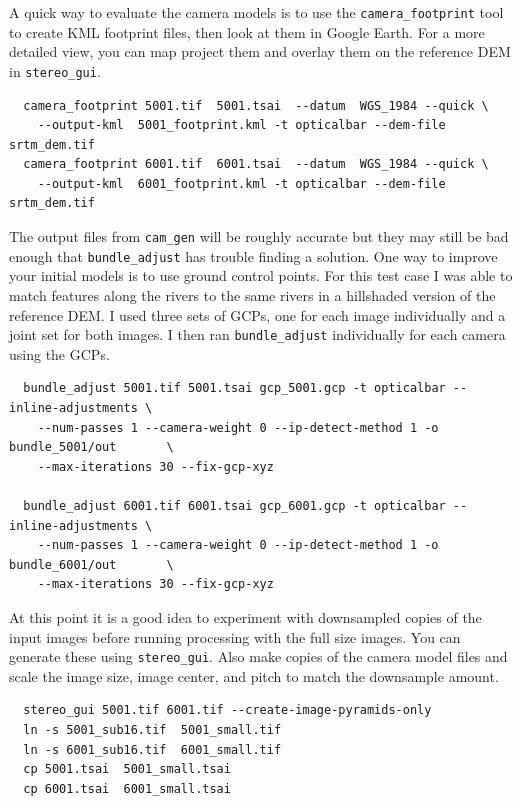 A quick way to evaluate the camera models is to use the \texttt{camera\_footprint} tool to
create KML footprint files, then look at them in Google Earth.  For a more detailed view,
you can map project them and overlay them on the reference DEM in \texttt{stereo\_gui}.

\begin{verbatim}
  camera_footprint 5001.tif  5001.tsai  --datum  WGS_1984 --quick \
    --output-kml  5001_footprint.kml -t opticalbar --dem-file srtm_dem.tif
  camera_footprint 6001.tif  6001.tsai  --datum  WGS_1984 --quick \
    --output-kml  6001_footprint.kml -t opticalbar --dem-file srtm_dem.tif
\end{verbatim}

The output files from \texttt{cam\_gen} will be roughly accurate but they may still be bad
enough that \texttt{bundle\_adjust} has trouble finding a solution.  One way to improve your
initial models is to use ground control points.  For this test case I was able to match
features along the rivers to the same rivers in a hillshaded version of the reference DEM.
I used three sets of GCPs, one for each image individually and a joint set for both images.
I then ran \texttt{bundle\_adjust} individually for each camera using the GCPs.

\begin{verbatim}
  bundle_adjust 5001.tif 5001.tsai gcp_5001.gcp -t opticalbar --inline-adjustments \
    --num-passes 1 --camera-weight 0 --ip-detect-method 1 -o bundle_5001/out       \
    --max-iterations 30 --fix-gcp-xyz

  bundle_adjust 6001.tif 6001.tsai gcp_6001.gcp -t opticalbar --inline-adjustments \
    --num-passes 1 --camera-weight 0 --ip-detect-method 1 -o bundle_6001/out       \
    --max-iterations 30 --fix-gcp-xyz
\end{verbatim}

At this point it is a good idea to experiment with downsampled copies of the input
images before running processing with the full size images.  You can generate these 
using \texttt{stereo\_gui}.  Also make copies of the camera model
files and scale the image size, image center, and pitch to match the downsample amount.

\begin{verbatim}
  stereo_gui 5001.tif 6001.tif --create-image-pyramids-only
  ln -s 5001_sub16.tif  5001_small.tif
  ln -s 6001_sub16.tif  6001_small.tif
  cp 5001.tsai  5001_small.tsai
  cp 6001.tsai  6001_small.tsai
\end{verbatim}

